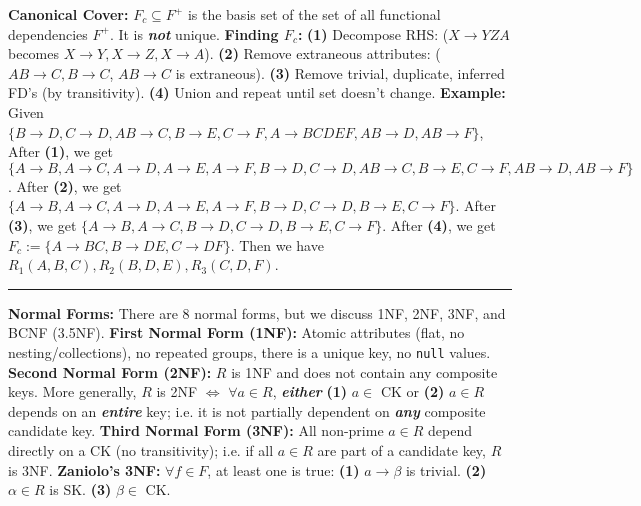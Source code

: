 \documentclass{report}
\renewcommand{\bf}[1]{\textbf{{#1}}}
\renewcommand{\tt}[1]{\texttt{{#1}}}
\newcommand{\ib}[1]{\textit{\textbf{{#1}}}}
\begin{document}
\bf{Canonical Cover:} $F_c \subseteq F^+$ is the basis set of the set of all functional dependencies
$F^+$. It is \ib{not} unique.
\hfil \newline
\bf{Finding $F_c$:} 
\bf{(1)} Decompose RHS: ($X \to YZA$ becomes $X \to Y, X \to Z, X \to A$).
\bf{(2)} Remove extraneous attributes: ($AB \to C, B \to C$, $AB \to C$ is extraneous).
\bf{(3)} Remove trivial, duplicate, inferred FD's (by transitivity).
\bf{(4)} Union and repeat until set doesn't change.
\hfil \newline
\bf{Example:} Given $\{B \to D, C \to D, AB \to C, B \to E, C \to F, A \to BCDEF, AB \to D, AB \to
F\}$,
\hfil \newline
After \bf{(1)}, we get $\{A \to B, A \to C, A \to D, A \to E, A \to F, B \to D, C \to D, AB \to C, B
\to E, C \to F, AB \to D, AB \to F\}$. 
\hfil \newline
After \bf{(2)}, we get $\{A \to B, A \to C, A \to D, A \to E, A \to F, B \to D, C \to D, B \to E, C
\to F\}$. 
\hfil \newline
After \bf{(3)}, we get $\{A \to B, A \to C, B \to D, C \to D, B \to E, C \to F\}$.
\hfil \newline
After \bf{(4)}, we get $F_c := \{A \to BC, B \to DE, C \to DF\}$. Then we have $R_1(A, B, C), R_2(B,
D, E), R_3(C, D, F)$.
\hfil \newline
\vspace{-0.8em}
\hrule
\vspace{0.2em}

\bf{Normal Forms:} There are 8 normal forms, but we discuss 1NF, 2NF, 3NF, and BCNF (3.5NF).
\hfil \newline
\bf{First Normal Form (1NF):} Atomic attributes (flat, no nesting/collections), no repeated groups,
there is a unique key, no \tt{null} values.
\hfil \newline
\bf{Second Normal Form (2NF):} $R$ is 1NF and does not contain any composite keys. More generally,
$R$ is 2NF $\iff$ $\forall a \in R$, \ib{either} \bf{(1)} $a \in$ CK or \bf{(2)} $a \in R$ depends 
on an \ib{entire} key; i.e. it is not partially dependent on \ib{any} composite candidate key.
\hfil \newline
\bf{Third Normal Form (3NF):} All non-prime $a \in R$ depend directly on a CK (no transitivity);
i.e. if all $a \in R$ are part of a candidate key, $R$ is 3NF.
\bf{Zaniolo's 3NF:} $\forall f \in F$, at least one is true: \bf{(1)} $a \to \beta$ is trivial.
\bf{(2)} $\alpha \in R$ is SK. \bf{(3)} $\beta \in$ CK.
\end{document}
